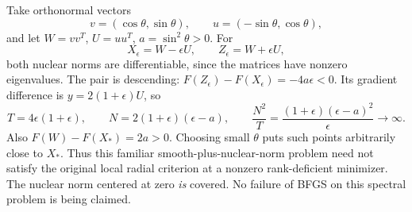 Take orthonormal vectors
\[
 v=(\cos\theta,\sin\theta),\qquad u=(-\sin\theta,\cos\theta),
\]
and let $W=vv^T$, $U=uu^T$, $a=\sin^2\theta>0$. For
\[
 X_\epsilon=W-\epsilon U,\qquad Z_\epsilon=W+\epsilon U,
\]
both nuclear norms are differentiable, since the matrices have nonzero eigenvalues. The pair is descending: $F(Z_\epsilon)-F(X_\epsilon)=-4a\epsilon<0$. Its gradient difference is $y=2(1+\epsilon)U$, so
\[
 T=4\epsilon(1+\epsilon),\qquad
 N=2(1+\epsilon)(\epsilon-a),\qquad
 \frac{N^2}{T}=\frac{(1+\epsilon)(\epsilon-a)^2}{\epsilon}\to\infty.
\]
Also $F(W)-F(X_*)=2a>0$. Choosing small $\theta$ puts such points arbitrarily close to $X_*$. Thus this familiar smooth-plus-nuclear-norm problem need not satisfy the original local radial criterion at a nonzero rank-deficient minimizer. The nuclear norm centered at zero \emph{is} covered. No failure of BFGS on this spectral problem is being claimed.


\endgroup
